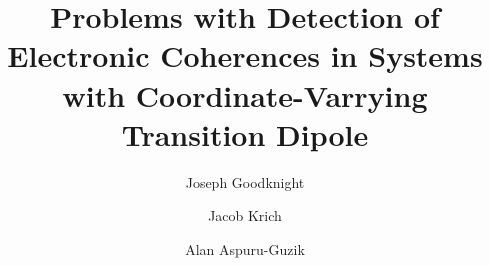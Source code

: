 



\title{Problems with Detection of Electronic Coherences in Systems with Coordinate-Varrying Transition Dipole}
\author{Joseph Goodknight}
\author{Jacob Krich }
\author{Alan Aspuru-Guzik}
\begin{abstract}
  
\end{abstract}

\maketitle








